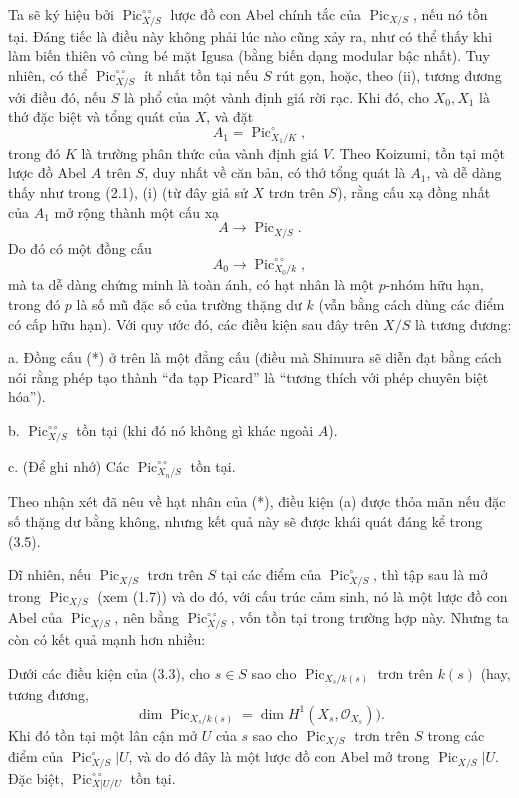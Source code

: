  Ta sẽ ký hiệu bởi
$\operatorname{Pic}_{X/S}^{\circ\circ}$ lược đồ con Abel chính tắc của
$\operatorname{Pic}_{X/S}$, nếu nó tồn tại. Đáng tiếc là điều này không phải
lúc nào cũng xảy ra, như có thể thấy khi làm biến thiên vô cùng bé mặt Igusa
(bằng biến dạng modular bậc nhất). Tuy nhiên, có thể
$\operatorname{Pic}_{X/S}^{\circ\circ}$ ít nhất tồn tại nếu $S$ rút gọn,
hoặc, theo (ii), tương đương với điều đó, nếu $S$ là phổ của một vành định giá
rời rạc. Khi đó, cho $X_0,X_1$ là thớ đặc biệt và tổng quát của $X$, và đặt
\[
A_1=\operatorname{Pic}_{X_1/K}^\circ,
\]
trong đó $K$ là trường phân thức của vành định giá $V$. Theo Koizumi, tồn tại
một lược đồ Abel $A$ trên $S$, duy nhất về căn bản, có thớ tổng quát là $A_1$,
và dễ dàng thấy như trong (2.1), (i) (từ đây giả sử $X$ trơn trên $S$), rằng
cấu xạ đồng nhất của $A_1$ mở rộng thành một cấu xạ
\[
A\longrightarrow\operatorname{Pic}_{X/S}.
\]
Do đó có một đồng cấu
\[
\tag{*}A_0\longrightarrow\operatorname{Pic}_{X_0/k}^{\circ\circ},
\]
mà ta dễ dàng chứng minh là toàn ánh, có hạt nhân là một $p$-nhóm hữu hạn,
trong đó $p$ là số mũ đặc số của trường thặng dư $k$
(vẫn bằng cách dùng các điểm có cấp hữu hạn). Với quy ước đó, các điều kiện
sau đây trên $X/S$ là tương đương:

\medskip
\noindent a. Đồng cấu (*) ở trên là một đẳng cấu (điều mà Shimura sẽ diễn đạt
bằng cách nói rằng phép tạo thành ``đa tạp Picard'' là ``tương thích với phép
chuyên biệt hóa'').

\noindent b. $\operatorname{Pic}_{X/S}^{\circ\circ}$ tồn tại (khi đó nó
không gì khác ngoài $A$).

\noindent c. (Để ghi nhớ) Các
$\operatorname{Pic}_{X_n/S}^{\circ\circ}$ tồn tại.

Theo nhận xét đã nêu về hạt nhân của (*), điều kiện (a) được thỏa mãn nếu đặc
số thặng dư bằng không, nhưng kết quả này sẽ được khái quát đáng kể trong
(3.5).

Dĩ nhiên, nếu $\operatorname{Pic}_{X/S}$ trơn trên $S$ tại các điểm của
$\operatorname{Pic}_{X/S}^\circ$, thì tập sau là mở trong
$\operatorname{Pic}_{X/S}$ (xem (1.7)) và do đó, với cấu trúc cảm sinh, nó là
một lược đồ con Abel của $\operatorname{Pic}_{X/S}$, nên bằng
$\operatorname{Pic}_{X/S}^{\circ\circ}$, vốn tồn tại trong trường hợp này.
Nhưng ta còn có kết quả mạnh hơn nhiều:

 Dưới các điều kiện của (3.3), cho $s\in S$ sao cho
$\operatorname{Pic}_{X_s/k(s)}$ trơn trên $k(s)$ (hay, tương đương,
\[
\dim\operatorname{Pic}_{X_s/k(s)}=\dim H^1(X_s,\mathcal O_{X_s})).
\]
Khi đó tồn tại một lân cận mở $U$ của $s$ sao cho
$\operatorname{Pic}_{X/S}$ trơn trên $S$ trong các điểm của $\operatorname{Pic}_{X/S}^\circ|U$, và do đó đây là một lược
đồ con Abel mở trong $\operatorname{Pic}_{X/S}|U$. Đặc biệt,
$\operatorname{Pic}_{X|U/U}^{\circ\circ}$ tồn tại.


